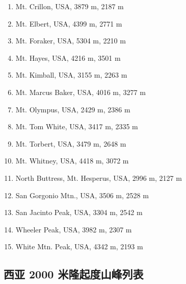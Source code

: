 \documentclass[10pt,twocolumn,letterpaper]{article}
\begin{document}
\begin{flushleft}
\begin{enumerate}
    \item Mt. Crillon, USA, 3879 m, 2187 m
    \item Mt. Elbert, USA, 4399 m, 2771 m
    \item Mt. Foraker, USA, 5304 m, 2210 m
    \item Mt. Hayes, USA, 4216 m, 3501 m
    \item Mt. Kimball, USA, 3155 m, 2263 m
    \item Mt. Marcus Baker, USA, 4016 m, 3277 m
    \item Mt. Olympus, USA, 2429 m, 2386 m
    \item Mt. Tom White, USA, 3417 m, 2335 m
    \item Mt. Torbert, USA, 3479 m, 2648 m
    \item Mt. Whitney, USA, 4418 m, 3072 m
    \item North Buttress, Mt. Hesperus, USA, 2996 m, 2127 m
    \item San Gorgonio Mtn., USA, 3506 m, 2528 m
    \item San Jacinto Peak, USA, 3304 m, 2542 m
    \item Wheeler Peak, USA, 3982 m, 2307 m
    \item White Mtn. Peak, USA, 4342 m, 2193 m
\end{enumerate}
\end{flushleft}

\subsection{西亚 2000 米隆起度山峰列表}
\end{document}
